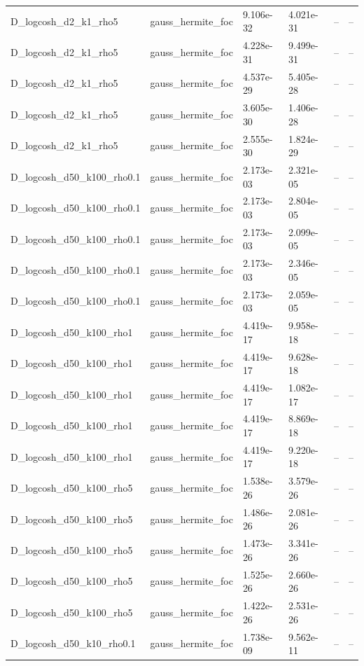 \begin{tabular}{llllll}
D\_logcosh\_d2\_k1\_rho5 & gauss\_hermite\_foc & 9.106e-32 & 4.021e-31 & -- & -- \\
D\_logcosh\_d2\_k1\_rho5 & gauss\_hermite\_foc & 4.228e-31 & 9.499e-31 & -- & -- \\
D\_logcosh\_d2\_k1\_rho5 & gauss\_hermite\_foc & 4.537e-29 & 5.405e-28 & -- & -- \\
D\_logcosh\_d2\_k1\_rho5 & gauss\_hermite\_foc & 3.605e-30 & 1.406e-28 & -- & -- \\
D\_logcosh\_d2\_k1\_rho5 & gauss\_hermite\_foc & 2.555e-30 & 1.824e-29 & -- & -- \\
D\_logcosh\_d50\_k100\_rho0.1 & gauss\_hermite\_foc & 2.173e-03 & 2.321e-05 & -- & -- \\
D\_logcosh\_d50\_k100\_rho0.1 & gauss\_hermite\_foc & 2.173e-03 & 2.804e-05 & -- & -- \\
D\_logcosh\_d50\_k100\_rho0.1 & gauss\_hermite\_foc & 2.173e-03 & 2.099e-05 & -- & -- \\
D\_logcosh\_d50\_k100\_rho0.1 & gauss\_hermite\_foc & 2.173e-03 & 2.346e-05 & -- & -- \\
D\_logcosh\_d50\_k100\_rho0.1 & gauss\_hermite\_foc & 2.173e-03 & 2.059e-05 & -- & -- \\
D\_logcosh\_d50\_k100\_rho1 & gauss\_hermite\_foc & 4.419e-17 & 9.958e-18 & -- & -- \\
D\_logcosh\_d50\_k100\_rho1 & gauss\_hermite\_foc & 4.419e-17 & 9.628e-18 & -- & -- \\
D\_logcosh\_d50\_k100\_rho1 & gauss\_hermite\_foc & 4.419e-17 & 1.082e-17 & -- & -- \\
D\_logcosh\_d50\_k100\_rho1 & gauss\_hermite\_foc & 4.419e-17 & 8.869e-18 & -- & -- \\
D\_logcosh\_d50\_k100\_rho1 & gauss\_hermite\_foc & 4.419e-17 & 9.220e-18 & -- & -- \\
D\_logcosh\_d50\_k100\_rho5 & gauss\_hermite\_foc & 1.538e-26 & 3.579e-26 & -- & -- \\
D\_logcosh\_d50\_k100\_rho5 & gauss\_hermite\_foc & 1.486e-26 & 2.081e-26 & -- & -- \\
D\_logcosh\_d50\_k100\_rho5 & gauss\_hermite\_foc & 1.473e-26 & 3.341e-26 & -- & -- \\
D\_logcosh\_d50\_k100\_rho5 & gauss\_hermite\_foc & 1.525e-26 & 2.660e-26 & -- & -- \\
D\_logcosh\_d50\_k100\_rho5 & gauss\_hermite\_foc & 1.422e-26 & 2.531e-26 & -- & -- \\
D\_logcosh\_d50\_k10\_rho0.1 & gauss\_hermite\_foc & 1.738e-09 & 9.562e-11 & -- & -- \\

\end{tabular}
